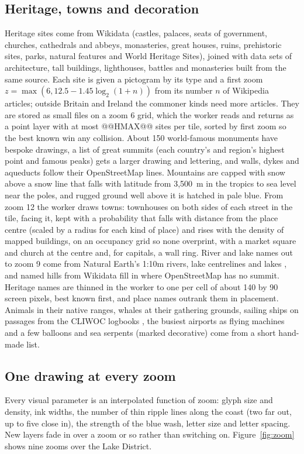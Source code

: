 \documentclass[11pt,a4paper]{article}
\begin{document}
\subsection{Heritage, towns and decoration}
Heritage sites come from Wikidata \citep{wikidata} (castles, palaces, seats of government, churches, cathedrals and abbeys, monasteries, great houses, ruins, prehistoric sites, parks, natural features and World Heritage Sites), joined with data sets of architecture, tall buildings, lighthouses, battles and monasteries built from the same source. Each site is given a pictogram by its type and a first zoom $z = \max(6, 12.5 - 1.45\log_2(1 + n))$ from its number $n$ of Wikipedia articles; outside Britain and Ireland the commoner kinds need more articles. They are stored as small files on a zoom 6 grid, which the worker reads and returns as a point layer with at most @@HMAX@@ sites per tile, sorted by first zoom so the best known win any collision. About 150 world-famous monuments have bespoke drawings, a list of great summits (each country's and region's highest point and famous peaks) gets a larger drawing and lettering, and walls, dykes and aqueducts follow their OpenStreetMap lines. Mountains are capped with snow above a snow line that falls with latitude from 3,500~m in the tropics to sea level near the poles, and rugged ground well above it is hatched in pale blue. From zoom 12 the worker draws towns: townhouses on both sides of each street in the tile, facing it, kept with a probability that falls with distance from the place centre (scaled by a radius for each kind of place) and rises with the density of mapped buildings, on an occupancy grid so none overprint, with a market square and church at the centre and, for capitals, a wall ring. River and lake names out to zoom 9 come from Natural Earth's 1:10m rivers, lake centrelines and lakes \citep{naturalearth}, and named hills from Wikidata fill in where OpenStreetMap has no summit. Heritage names are thinned in the worker to one per cell of about 140 by 90 screen pixels, best known first, and place names outrank them in placement. Animals in their native ranges, whales at their gathering grounds, sailing ships on passages from the CLIWOC logbooks \citep{cliwoc}, the busiest airports as flying machines and a few balloons and sea serpents (marked decorative) come from a short hand-made list.

\subsection{One drawing at every zoom}
Every visual parameter is an interpolated function of zoom: glyph size and density, ink widths, the number of thin ripple lines along the coast (two far out, up to five close in), the strength of the blue wash, letter size and letter spacing. New layers fade in over a zoom or so rather than switching on. Figure~\ref{fig:zoom} shows nine zooms over the Lake District.
\end{document}
